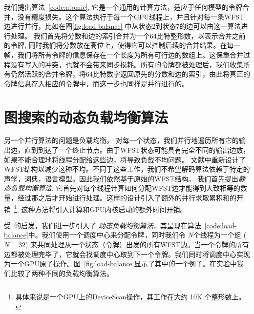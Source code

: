我们提出算法~\ref{code:atomic}, 它是一个通用的计算方法，适应于任何模型的令牌合并，没有精度损失。这个算法执行于每一个GPU线程上，并且针对每一条WFST边进行并行，比如在图\ref{fig:load-balance} 中从状态2到状态7的边可以由这一算法进行处理。
我们首先将分数和边的索引合并为一个64比特整形数，以表示合并之前的令牌, 同时我们将分数放在高位上，使得它可以控制后续的合并结果。在每一帧，我们将所有令牌的信息保存在一个长度为所有可行边的数组上。这保重合并过程没有写入的冲突，也就不会带来同步损耗。所有的令牌都被处理后，我们收集所有仍然活跃的合并令牌，将64比特数字返回原先的分数和边的索引，由此将真正的令牌信息存入相应的令牌中，而这一步也同样是并行进行的。


\section{图搜索的动态负载均衡算法}
\label{sec:para-viterbi}

另一个并行算法的问题是负载均衡。
对每一个状态，我们并行地遍历所有它的输出边，直到到达了一个终止节点。由于WFST状态可能具有完全不同的输出边数，如果不能合理地将线程分配给这些边，将导致负载不均问题。
文献\cite{you2009parallel,mendis2016parallelizing}中重新设计了 WFST结构以减少这种不均。不同于这些工作，我们不希望解码算法依赖于特定的声学，词典，语言模型。因此我们依然基于原始的WFST结构。
我们首先提出\textit{静态负载均衡算法}, 它首先对每个线程计算如何分配WFST边才能得到大致相等的数量，经过那之后才开始进行处理。这样的设计引入了额外的并行求取累积和的开销~\footnote{具体来说是一个GPU上的DeviceScan操作，其工作在大约 10K 个整形数上。},
这种方法将引入计算和GPU内核启动的额外时间开销。

受~\cite{alakeel2010}的启发，我们进一步引入了
\textit{动态负载均衡算法}，其呈现在算法~\ref{code:load-balance}中。我们使用一个调度中心来分配令牌，同时我们令 $N$个线程为一个组 ($N = 32$) 来共同处理从一个状态（令牌）出发的所有WFST边。当一个令牌的所有边都被处理完毕了，它就会找调度中心取到下一个令牌。我们同时将调度中心实现为一个GPU原子操作。图~\ref{fig:load-balance}显示了其中的一个例子。在实验中我们比较了两种不同的负载均衡算法。


